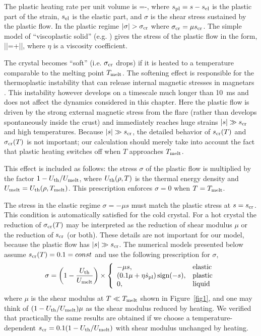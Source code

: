 The plastic heating rate per unit volume is 
\beq 
    =-\sigma\dspl, 
\eeq
where $s_{\rm pl}=s-s_{\rm el}$ is the plastic part of the strain, $s_{\rm el}$ is the elastic part, and $\sigma$ is the shear stress sustained by the plastic flow.
In the plastic regime $|\sigma|>\sigcr$ where $\sigma_{\rm cr}=\mu s_{\rm cr}$. 
The simple model of ``viscoplastic solid'' (e.g. \citet{ir08}) gives the stress of the plastic flow in the form,
\beq
   |\sigma|=\sigcr+\eta|\dspl|, 
\eeq
where $\eta$ is a viscosity coefficient.

The crystal becomes ``soft'' (i.e. $\sigma_{\rm cr}$ drops) if it is heated to a temperature 
comparable to the melting point $T_{\rm melt}$. 
The softening effect is responsible for the thermoplastic instability that can release internal magnetic stresses in magnetars \citep{2014ApJ...794L..24B}.
This instability however develops on a timescale much longer than 10~ms and does not affect the dynamics considered in this chapter. 
Here the plastic flow is driven by the strong external magnetic stress from the flare (rather than develops spontaneously inside the crust) and immediately reaches huge strains $|s|\gg s_{\rm cr}$ and high temperatures.
Because $|s|\gg s_{\rm cr}$, the detailed behavior of $s_{\rm cr}(T)$ and $\sigma_{\rm cr}(T)$ is not important; our calculation should merely take into account the fact that plastic heating switches off when $T$ approaches $T_{\rm melt}$.

This effect is included as follows: the stress $\sigma$ of the plastic flow is multiplied by the factor $1-U_{\rm th}/U_{\rm melt}$, where $U_{\rm th}(\rho,T)$ is the thermal energy density and $U_{\rm melt}=U_{\rm th}(\rho,T_{\rm melt})$. 
This prescription enforces $\sigma=0$ when $T=T_{\rm melt}$.

The stress in the elastic regime $\sigma=-\mu s$ must match the plastic stress at $s=s_{\rm cr}$. 
This condition is automatically satisfied for the cold crystal. 
For a hot crystal the reduction of $\sigma_{\rm cr}(T)$ may be interpreted as the reduction of shear modulus $\mu$ or the reduction of $s_{\rm cr}$ (or both). 
These details are not important for our model, because the plastic flow has $|s|\gg s_{\rm cr}$. 
The numerical models presented below assume $s_{\rm cr}(T)=0.1=const$ and use the following prescription for $\sigma$,
\begin{equation}
\label{eq:sigma}
\sigma =
  \left(1-\frac{U_{\rm th}}{U_{\rm melt}}\right)  \times
   \left\{
  \begin{array}{ll}
     -\mu s, &  \textrm{elastic}\\
   \left(0.1
    \mu +\eta \dot{s}_{\rm pl}\right) {\rm sign}(-s),
    & \textrm{plastic}\\
    0, & \textrm{liquid}
  \end{array}
\right.
\end{equation}
where $\mu$ is the shear modulus at $T\ll T_{\rm melt}$ shown in Figure~\ref{fig1}, and one may think of $(1-U_{\rm th}/U_{\rm melt})\mu$ as the shear modulus reduced by heating. 
We verified that practically the same results are obtained if we choose a temperature-dependent $s_{\rm cr}=0.1(1-U_{\rm th}/U_{\rm melt})$ with shear modulus unchanged by heating.

